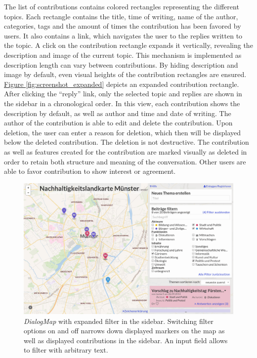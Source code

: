 The list of contributions contains colored rectangles representing the different topics. Each rectangle contains the title, time of writing, name of the author, categories, tags and the amount of times the contribution has been favored by users. It also contains a link, which navigates the user to the replies written to the topic. A click on the contribution rectangle expands it vertically, revealing the description and image of the current topic. This mechanism is implemented as description length can vary between contributions. By hiding description and image by default, even visual heights of the contribution rectangles are ensured. \hyperref[fig:screenshot_filter]{Figure \ref{fig:screenshot_expanded}} depicts an expanded contribution rectangle.\\
After clicking the ``reply'' link, only the selected topic and replies are shown in the sidebar in a chronological order. In this view, each contribution shows the description by default, as well as author and time and date of writing. The author of the contribution is able to edit and delete the contribution. Upon deletion, the user can enter a reason for deletion, which then will be displayed below the deleted contribution. The deletion is not destructive. The contribution as well as features created for the contribution are marked visually as deleted in order to retain both structure and meaning of the conversation. Other users are able to favor contribution to show interest or agreement.

\begin{figure}[!h]
    \centering
    \includegraphics[width=1\columnwidth]{images/screenshot_filters}
    \caption{\textit{DialogMap} with expanded filter in the sidebar. Switching filter options on and off narrows down displayed markers on the map as well as displayed contributions in the sidebar. An input field allows to filter with arbitrary text.}
    \label{fig:screenshot_filter}
\end{figure}

